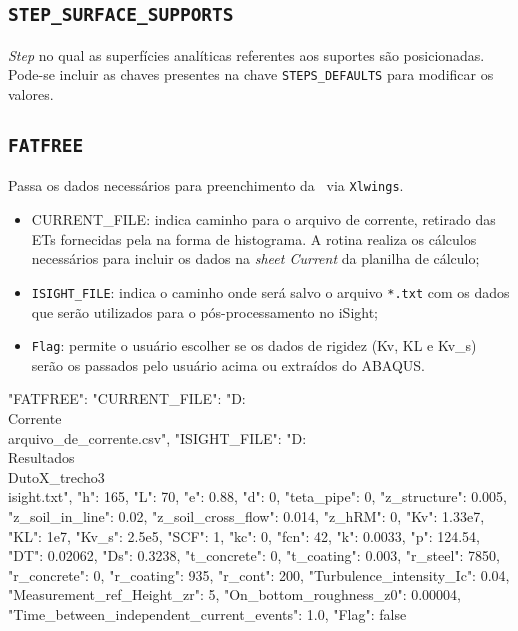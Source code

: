 \subsection{\texttt{STEP\_SURFACE\_SUPPORTS}}

\textit{Step} no qual as superfícies analíticas referentes aos suportes são posicionadas. Pode-se incluir as chaves presentes na chave \texttt{STEPS\_DEFAULTS} para modificar os valores.


\subsection{\texttt{FATFREE}}

Passa os dados necessários para preenchimento da \fatfree~via \texttt{Xlwings}.

\begin{itemize}
  \item {CURRENT\_FILE}: indica caminho para o arquivo de corrente, retirado das ETs fornecidas pela na forma de histograma. A rotina realiza os cálculos necessários para incluir os dados na \textit{sheet Current} da planilha de cálculo;
  \item \texttt{ISIGHT\_FILE}: indica o caminho onde será salvo o arquivo \texttt{*.txt} com os dados que serão utilizados para o pós-processamento no iSight;
  \item \texttt{Flag}: permite o usuário escolher se os dados de rigidez (Kv, KL e  Kv\_s) serão os passados pelo usuário acima ou extraídos do ABAQUS.
\end{itemize}

\begin{jsoncode}
{
  "FATFREE": {
    "CURRENT_FILE": "D:\\Corrente\\arquivo_de_corrente.csv",
    "ISIGHT_FILE": "D:\\Resultados\\DutoX_trecho3\\isight.txt",
    "h": 165,
    "L": 70,
    "e": 0.88,
    "d": 0,
    "teta_pipe": 0,
    "z_structure": 0.005,
    "z_soil_in_line": 0.02,
    "z_soil_cross_flow": 0.014,
    "z_hRM": 0,
    "Kv": 1.33e7,
    "KL": 1e7,
    "Kv_s": 2.5e5,
    "SCF": 1,
    "kc": 0,
    "fcn": 42,
    "k": 0.0033,
    "p": 124.54,
    "DT": 0.02062,
    "Ds": 0.3238,
    "t_concrete": 0,
    "t_coating": 0.003,
    "r_steel": 7850,
    "r_concrete": 0,
    "r_coating": 935,
    "r_cont": 200,
    "Turbulence_intensity_Ic": 0.04,
    "Measurement_ref_Height_zr": 5,
    "On_bottom_roughness_z0": 0.00004,
    "Time_between_independent_current_events": 1.0,
    "Flag": false
  }
}
\end{jsoncode}